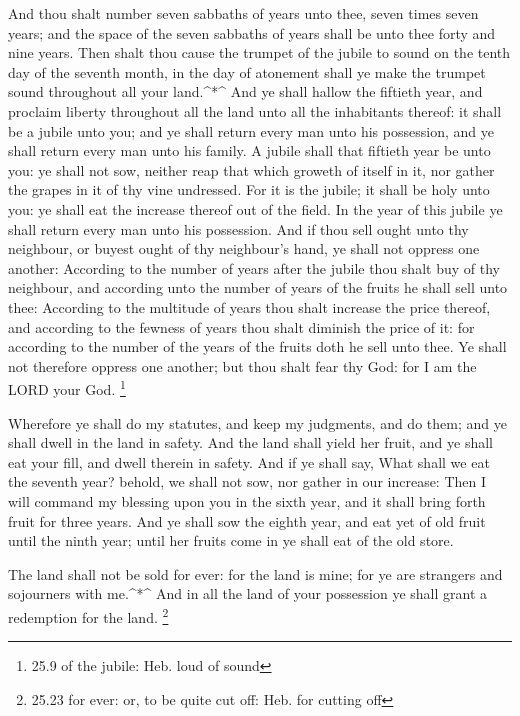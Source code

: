 And thou shalt number seven sabbaths of years unto thee,
seven times seven years; and the space of the seven sabbaths of years
shall be unto thee forty and nine years.  Then shalt thou
cause the trumpet of the jubile to sound on the tenth day of the seventh
month, in the day of atonement shall ye make the trumpet sound
throughout all your land.\^{}*\^{}  And ye shall hallow the
fiftieth year, and proclaim liberty throughout all the land unto all the
inhabitants thereof: it shall be a jubile unto you; and ye shall return
every man unto his possession, and ye shall return every man unto his
family.  A jubile shall that fiftieth year be unto you: ye
shall not sow, neither reap that which groweth of itself in it, nor
gather the grapes in it of thy vine undressed.  For it is
the jubile; it shall be holy unto you: ye shall eat the increase thereof
out of the field.  In the year of this jubile ye shall
return every man unto his possession.  And if thou sell
ought unto thy neighbour, or buyest ought of thy neighbour's hand, ye
shall not oppress one another:  According to the number of
years after the jubile thou shalt buy of thy neighbour, and according
unto the number of years of the fruits he shall sell unto thee:
 According to the multitude of years thou shalt increase
the price thereof, and according to the fewness of years thou shalt
diminish the price of it: for according to the number of the years of
the fruits doth he sell unto thee.  Ye shall not therefore
oppress one another; but thou shalt fear thy God: for I am the LORD your
God. \footnote{25.9 of the jubile: Heb. loud of sound}

 Wherefore ye shall do my statutes, and keep my judgments,
and do them; and ye shall dwell in the land in safety.  And
the land shall yield her fruit, and ye shall eat your fill, and dwell
therein in safety.  And if ye shall say, What shall we eat
the seventh year? behold, we shall not sow, nor gather in our increase:
 Then I will command my blessing upon you in the sixth
year, and it shall bring forth fruit for three years.  And
ye shall sow the eighth year, and eat yet of old fruit until the ninth
year; until her fruits come in ye shall eat of the old store.

 The land shall not be sold for ever: for the land is mine;
for ye are strangers and sojourners with me.\^{}*\^{}  And
in all the land of your possession ye shall grant a redemption for the
land. \footnote{25.23 for ever: or, to be quite cut off: Heb. for
  cutting off}


